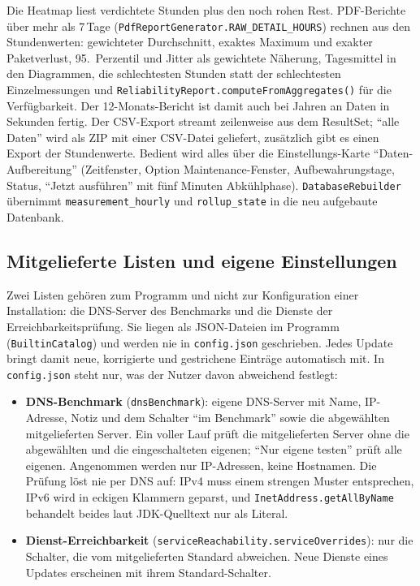 Die Heatmap liest verdichtete Stunden plus den noch rohen Rest. PDF-Berichte über mehr als
7\,Tage (\texttt{PdfReportGenerator.RAW\_DETAIL\_HOURS}) rechnen aus den Stundenwerten:
gewichteter Durchschnitt, exaktes Maximum und exakter Paketverlust, 95.\ Perzentil und Jitter
als gewichtete Näherung, Tagesmittel in den Diagrammen, die schlechtesten Stunden statt der
schlechtesten Einzelmessungen und \texttt{ReliabilityReport.computeFromAggregates()} für die
Verfügbarkeit. Der 12-Monats-Bericht ist damit auch bei Jahren an Daten in Sekunden fertig.
Der CSV-Export streamt zeilenweise aus dem ResultSet; \enquote{alle Daten} wird als ZIP mit
einer CSV-Datei geliefert, zusätzlich gibt es einen Export der Stundenwerte. Bedient wird
alles über die Einstellungs-Karte \enquote{Daten-Aufbereitung} (Zeitfenster, Option
Maintenance-Fenster, Aufbewahrungstage, Status, \enquote{Jetzt ausführen} mit fünf Minuten
Abkühlphase). \texttt{DatabaseRebuilder} übernimmt \texttt{measurement\_hourly} und
\texttt{rollup\_state} in die neu aufgebaute Datenbank.

\subsection{Mitgelieferte Listen und eigene Einstellungen}
\label{subsec:catalog}

Zwei Listen gehören zum Programm und nicht zur Konfiguration einer Installation: die
DNS-Server des Benchmarks und die Dienste der Erreichbarkeitsprüfung. Sie liegen als
JSON-Dateien im Programm (\texttt{BuiltinCatalog}) und werden nie in \texttt{config.json}
geschrieben. Jedes Update bringt damit neue, korrigierte und gestrichene Einträge automatisch
mit. In \texttt{config.json} steht nur, was der Nutzer davon abweichend festlegt:

\begin{itemize}
  \item \textbf{DNS-Benchmark} (\texttt{dnsBenchmark}): eigene DNS-Server mit Name, IP-Adresse,
    Notiz und dem Schalter \enquote{im Benchmark} sowie die abgewählten mitgelieferten Server.
    Ein voller Lauf prüft die mitgelieferten Server ohne die abgewählten und die eingeschalteten
    eigenen; \enquote{Nur eigene testen} prüft alle eigenen. Angenommen werden nur IP-Adressen,
    keine Hostnamen. Die Prüfung löst nie per DNS auf: IPv4 muss einem strengen Muster
    entsprechen, IPv6 wird in eckigen Klammern geparst, und \texttt{InetAddress.getAllByName}
    behandelt beides laut JDK-Quelltext nur als Literal.
  \item \textbf{Dienst-Erreichbarkeit} (\texttt{serviceReachability.serviceOverrides}): nur die
    Schalter, die vom mitgelieferten Standard abweichen. Neue Dienste eines Updates erscheinen
    mit ihrem Standard-Schalter.
\end{itemize}

